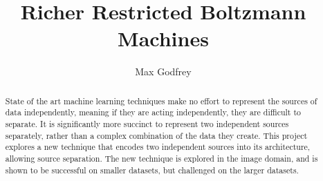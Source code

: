 \documentclass[11pt, a4paper, twoside, openright
              ]{report}
\title{Richer Restricted Boltzmann Machines}
\author{Max Godfrey}
\date{}
\begin{document}
\frontmatter



\begin{abstract}

State of the art machine learning techniques make no effort to represent the sources of data independently, meaning if they are acting independently, they are difficult to separate. It is significantly more succinct to represent two independent sources separately, rather than a complex combination of the data they create. This project explores a new technique that encodes two independent sources into its architecture, allowing source separation. The new technique is explored in the image domain, and is shown to be successful on smaller datasets, but challenged on the larger datasets.

\end{abstract}


\maketitle



\tableofcontents



\mainmatter%









\backmatter%




\end{document}
